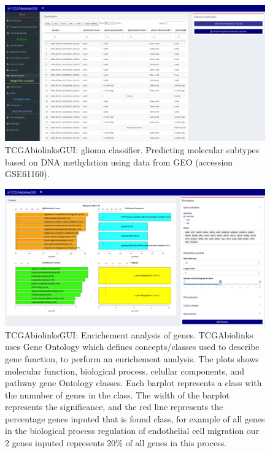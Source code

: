   \begin{figure}[h!]
  \centering
  \includegraphics[width=1.0\textwidth]{images/glioma_classifier.pdf}
  \caption[TCGAbiolinksGUI: glioma classifier]{TCGAbiolinksGUI: glioma classifier. Predicting molecular subtypes based on DNA methylation using data from GEO (accession GSE61160).}
  \label{fig:glioma}
   \end{figure}

\begin{figure}
\includegraphics[width=1.0\linewidth]{images/gui_ea.png}
\caption[TCGAbiolinksGUI: Enrichement analysis of genes]{TCGAbiolinksGUI: Enrichement analysis of genes.
 TCGAbiolinks uses Gene Ontology which defines concepts/classes used to describe gene function, to perform an enrichement analysis. The plots shows  molecular function, biological process, celullar components, and pathway gene Ontology classes.
 Each barplot represents a class with the numnber of genes in the class. The width of the barplot represents the significance, and the red line represents the percentage genes inputed that is found class, for example of all genes in the biological process regulation of endothelial cell migration our 2 genes inputed represents 20\% of all genes in this process.}
\label{fig:gui_ea}
\end{figure}


